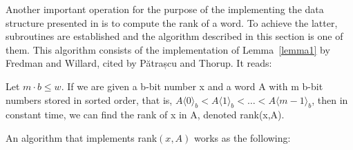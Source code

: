 Another important operation for the purpose of the implementing the data structure presented in \cite{patrascu2014dynamic} is to compute the rank of a word. To achieve the latter, subroutines are established and the algorithm described in this section is one of them. This algorithm consists of the implementation of Lemma~\ref{lemma1} by Fredman and Willard, cited by Pătrașcu and Thorup. It reads:
\begin{lemma} \label{lemma1}
Let $m \cdot b \leq w$. If we are given a b-bit number x and a word A with m b-bit numbers stored in sorted order, that is, $A\langle 0 \rangle_b < A\langle 1 \rangle_b < \dots < A\langle m - 1 \rangle_b$, then in constant time, we can find the rank of x in A, denoted rank(x,A).
\end{lemma}
An algorithm that implements rank$(x,A)$ works as the following:
